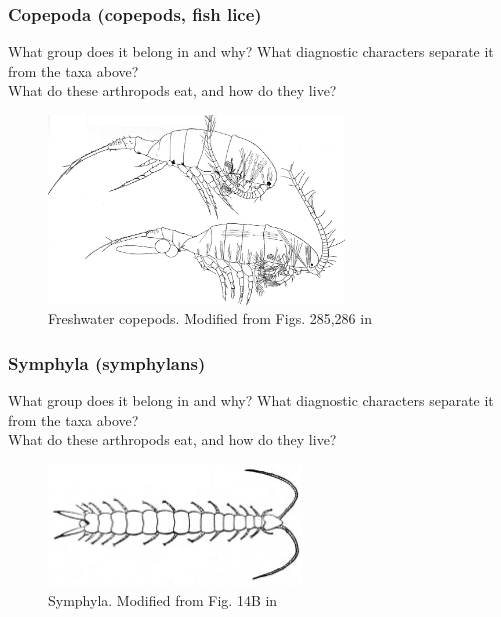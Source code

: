 \documentclass[letterpaper, 11pt]{article}
\begin{document}
\subsubsection*{Copepoda (copepods, fish lice)}
What group does it belong in and why? What diagnostic characters separate it from the taxa above?\\

\noindent{}What do these arthropods eat, and how do they live?\vspace{2cm}

\begin{figure}[ht!]
  \centering
    \includegraphics[width=0.7\textwidth]{copepoda.jpg}
  \caption{Freshwater copepods. Modified from Figs. 285,286 in \cite{bhlitem155735cope}}
  \label{fig:copepod}
\end{figure}

\subsubsection*{Symphyla (symphylans)}
What group does it belong in and why? What diagnostic characters separate it from the taxa above?\\

\noindent{}What do these arthropods eat, and how do they live?\vspace{2cm}

\begin{figure}[ht!]
  \centering
    \includegraphics[width=0.6\textwidth]{symphyla.png}
  \caption{Symphyla. Modified from Fig. 14B in \cite{bhlitem16837entom}}
  \label{fig:symphyla}
\end{figure}
\end{document}
